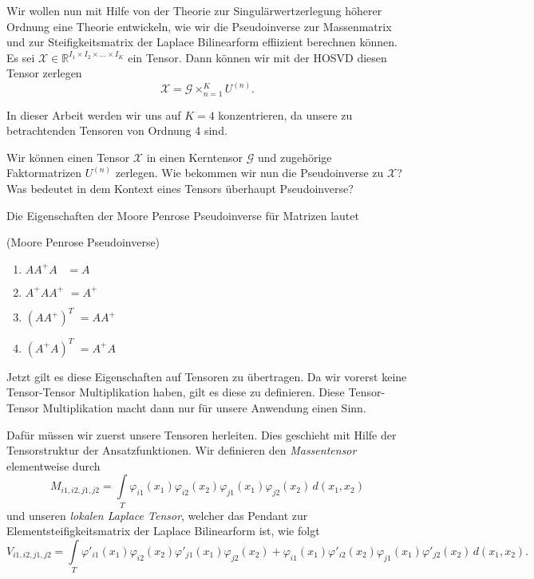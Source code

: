 Wir wollen nun mit Hilfe von der Theorie zur Singulärwertzerlegung höherer Ordnung eine Theorie entwickeln, wie wir die Pseudoinverse zur Massenmatrix und zur Steifigkeitsmatrix der Laplace Bilinearform effiizient berechnen können. 
Es sei $\pmb{\mathscr{X}}  \in \mathbb{R}^{I_1 \times I_2 \times \dots \times I_K}$ ein Tensor. Dann können wir mit der HOSVD diesen Tensor zerlegen
\begin{equation}
\pmb{\mathscr{X}} = \pmb{\mathscr{G}} \times_{n=1}^{K} U^{ (n) }.
\end{equation}

In dieser Arbeit werden wir uns auf $K=4$ konzentrieren, da unsere zu betrachtenden Tensoren von Ordnung 4 sind.

Wir können einen Tensor $\pmb{\mathscr{X}}$ in einen Kerntensor $\pmb{\mathscr{G}}$ und zugehörige Faktormatrizen $U^{(n)}$ zerlegen. Wie bekommen wir nun die Pseudoinverse zu $\pmb{\mathscr{X}}$? Was bedeutet in dem Kontext eines Tensors überhaupt Pseudoinverse?

Die Eigenschaften der Moore Penrose Pseudoinverse für Matrizen lautet
\begin{Lemma} (Moore Penrose Pseudoinverse) \label{lemma:penrose}
\begin{enumerate}
\item $AA^{+}A \, \, \, \, \,  =A$
\item $A^{+}AA^{+} \, \, =A^{+}$ 
\item $(AA^{+})^{T} \, \,  =AA^{+}$
\item $(A^{+}A)^{T} \, \, =A^{+}A$ 
\end{enumerate}
\end{Lemma}

Jetzt gilt es diese Eigenschaften auf Tensoren zu übertragen. Da wir vorerst keine Tensor-Tensor Multiplikation haben, gilt es diese zu definieren. Diese Tensor-Tensor Multiplikation macht dann nur für unsere Anwendung einen Sinn.

Dafür müssen wir zuerst unsere Tensoren herleiten. Dies geschieht mit Hilfe der Tensorstruktur der Ansatzfunktionen.
Wir definieren den \textit{Massentensor} elementweise durch
\begin{equation} 
M_{i1,i2,j1,j2} = \int\limits_{T} \varphi_{i1} (x_1) \varphi_{i2}(x_2) \varphi_{j1} (x_1) \varphi_{j2} (x_2) \, d(x_1,x_2)
\end{equation}
und unseren \textit{lokalen Laplace Tensor}, welcher das Pendant zur Elementsteifigkeitsmatrix der Laplace Bilinearform ist, wie folgt
\begin{equation} 
V_{i1,i2,j1,j2} = \int\limits_{T} \varphi'_{i1} (x_1) \varphi_{i2}(x_2) \varphi'_{j1} (x_1) \varphi_{j2} (x_2) +
\varphi_{i1} (x_1) \varphi'_{i2}(x_2) \varphi_{j1} (x_1) \varphi'_{j2} (x_2) \, d(x_1,x_2).
\end{equation}

